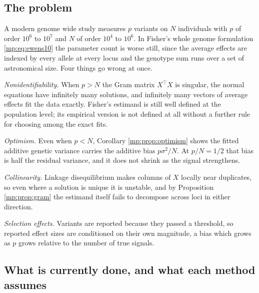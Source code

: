 \subsection{The problem}

A modern genome wide study measures $p$ variants on $N$ individuals with $p$ of order $10^6$
to $10^7$ and $N$ of order $10^4$ to $10^6$. In Fisher's whole genome formulation
\eqref{mp:eq:ewens10} the parameter count is worse still, since the average effects are indexed
by every allele at every locus and the genotype sum runs over a set of astronomical size.
Four things go wrong at once.

\emph{Nonidentifiability.} When $p>N$ the Gram matrix $X^\top X$ is singular, the normal
equations have infinitely many solutions, and infinitely many vectors of average effects fit
the data exactly. Fisher's estimand is still well defined at the population level; its
empirical version is not defined at all without a further rule for choosing among the exact
fits.

\emph{Optimism.} Even when $p<N$, Corollary \ref{mp:prop:optimism} shows the fitted additive
genetic variance carries the additive bias $p\sigma^2/N$. At $p/N=1/2$ that bias is half the
residual variance, and it does not shrink as the signal strengthens.

\emph{Collinearity.} Linkage disequilibrium makes columns of $X$ locally near duplicates, so
even where a solution is unique it is unstable, and by Proposition \ref{mp:prop:gram} the
estimand itself fails to decompose across loci in either direction.

\emph{Selection effects.} Variants are reported because they passed a threshold, so reported
effect sizes are conditioned on their own magnitude, a bias which grows as $p$ grows relative
to the number of true signals.

\subsection{What is currently done, and what each method assumes}

